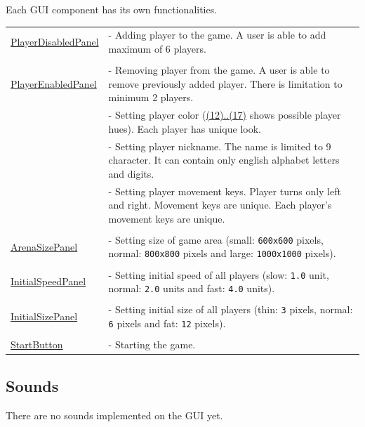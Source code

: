 \noindent Each GUI component has its own functionalities.
\begin{longtable}{L{0.2\textwidth}L{0.76\textwidth}}
		\hspace*{-.225cm}\hyperref[gui-playerpanels]{PlayerDisabledPanel} & - Adding player to the game. A user is able to add maximum of 6 players.\\
		& \\
		\hspace*{-.225cm}\hyperref[gui-playerpanels]{PlayerEnabledPanel} & - Removing player from the game. A user is able to remove previously added player. There is limitation to minimum 2 players.\\
		& - Setting player color (\hyperref[gui-colors]{(12)..(17)} shows possible player hues). Each player has unique look.\\
		& - Setting player nickname. The name is limited to 9 character. It can contain only english alphabet letters and digits.\\
		& - Setting player movement keys. Player turns only left and right. Movement keys are unique. Each player's movement keys are unique.\\
		& \\
		\hspace*{-.225cm}\hyperref[gui-initialsettingpanels]{ArenaSizePanel} & - Setting size of game area (small: \verb|600x600| pixels, normal: \verb|800x800| pixels and large: \verb|1000x1000| pixels).\\
		& \\
		\hspace*{-.225cm}\hyperref[gui-initialsettingpanels]{InitialSpeedPanel} & - Setting initial speed of all players (slow: \verb|1.0| unit, normal: \verb|2.0| units and fast: \verb|4.0| units).\\
		& \\
		\hspace*{-.225cm}\hyperref[gui-initialsettingpanels]{InitialSizePanel} & - Setting initial size of all players (thin: \verb|3| pixels, normal: \verb|6| pixels and fat: \verb|12| pixels).\\
		& \\
		\hspace*{-.225cm}\hyperref[gui-startbutton]{StartButton} & - Starting the game. \\
\end{longtable}

\subsection{Sounds}
\indent There are no sounds implemented on the GUI yet.